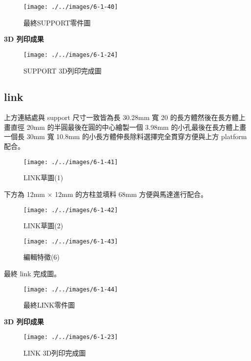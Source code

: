 \begin{figure}[htbp]
    \centering
    \texttt{[image: ./../images/6-1-40]}
    \caption{最終SUPPORT零件圖}
\end{figure}

\textbf{3D 列印成果}

\begin{figure}[htbp]
    \centering
    \texttt{[image: ./../images/6-1-24]}
    \caption{SUPPORT 3D列印完成圖}
\end{figure}
\newpage
\subsection{link}

上方連結處與 support 尺寸一致皆為長 30.28mm 寬 20 的長方體然後在長方體上畫直徑 20mm 的半圓最後在圓的中心繪製一個 3.98mm 的小孔最後在長方體上畫一個長 30mm 寬 10.8mm 的小長方體伸長除料選擇完全貫穿方便與上方 platform 配合。

\begin{figure}[htbp]
    \centering
    \texttt{[image: ./../images/6-1-41]}
    \caption{LINK草圖(1)}
\end{figure}

下方為 12mm $\times$ 12mm 的方柱並填料 68mm 方便與馬達進行配合。

\begin{figure}[h!]
    \centering
    \begin{minipage}[b]{0.6\textwidth}
        \centering
        \texttt{[image: ./../images/6-1-42]}
        \caption{LINK草圖(2)}
    \end{minipage}
    \hfill
    \begin{minipage}[b]{0.35\textwidth}
        \centering
        \texttt{[image: ./../images/6-1-43]} 
        \caption{編輯特徵(6)}
    \end{minipage}
\end{figure}

\newpage

最終 link 完成圖。

\begin{figure}[htbp]
    \centering
    \texttt{[image: ./../images/6-1-44]}
    \caption{最終LINK零件圖}
\end{figure}

\textbf{3D 列印成果}

\begin{figure}[htbp]
    \centering
    \texttt{[image: ./../images/6-1-23]}
    \caption{LINK 3D列印完成圖}
\end{figure}

